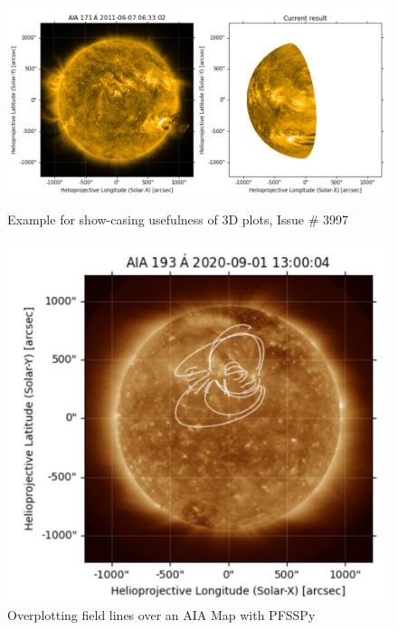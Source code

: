     \begin{figure}[H]
        \centering
        \includegraphics[scale=0.5]{figs/fig_3d_1.jpg}
        \caption{Example for show-casing usefulness of 3D plots, Issue \# 3997}
        \includegraphics[scale=0.5]{figs/fig_3d_pfss_2.jpg}
        \caption{Overplotting field lines over an AIA Map with PFSSPy}
        \label{fig:pfsspy}
    \end{figure}
